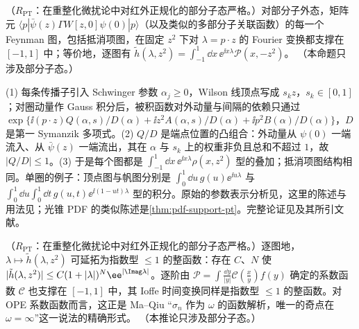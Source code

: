 
\begin{proposition}\label{prop:lamet-support}
（$R_{\mathrm{PT}}$：在重整化微扰论中对红外正规化的部分子态严格。）对部分子外态，矩阵元 $\langle p|\bar\psi(z)\Gamma W[z,0]\psi(0)|p\rangle$（以及类似的多部分子关联函数）的每一个 Feynman 图，包括抵消项图，在固定 $z^2$ 下对 $\lambda=p\cdot z$ 的 Fourier 变换都支撑在 $[-1,1]$ 中；等价地，逐图有 $\tilde h(\lambda,z^2)=\int_{-1}^1\dd x\,\ee^{\ii x\lambda}\mathcal P(x,-z^2)$。%
（本命题只涉及部分子态。）
\end{proposition}

\begin{proofsketch}
(1) 每条传播子引入 Schwinger 参数 $\alpha_j\ge0$，Wilson 线顶点写成 $s_kz$，$s_k\in[0,1]$；对圈动量作 Gauss 积分后，被积函数对外动量与间隔的依赖只通过 $\exp\{\ii(p\cdot z)Q(\alpha,s)/D(\alpha)+\ii z^2A(\alpha,s)/D(\alpha)+\ii p^2B(\alpha)/D(\alpha)\}$，$D$ 是第一 Symanzik 多项式。(2) $Q/D$ 是端点位置的凸组合：外动量从 $\psi(0)$ 一端流入、从 $\bar\psi(z)$ 一端流出，其在 $\alpha$ 与 $s_k$ 上的权重非负且总和不超过 $1$，故 $|Q/D|\le1$。(3) 于是每个图都是 $\int_{-1}^1\dd x\,\ee^{\ii x\lambda}\rho(x,z^2)$ 型的叠加；抵消项图结构相同。单圈的例子：顶点图与帆图分别是 $\int_0^1\dd u\,g(u)\ee^{\ii u\lambda}$ 与 $\int_0^1\dd u\int_0^1\dd t\,g(u,t)\ee^{\ii(1-ut)\lambda}$ 型的积分\cite[第~III~节]{IzubuchiEtAl2018}。原始的参数表示分析见\cite{Radyushkin:1983wh}，这里的陈述与用法见\cite{Radyushkin2017,Radyushkin:2018cvn,IzubuchiEtAl2018}；光锥 PDF 的类似陈述是\cref{thm:pdf-support-pt}。完整论证见\cite{Radyushkin2017}及其所引文献。
\end{proofsketch}

\begin{corollary}\label{cor:lamet-entire}
（$R_{\mathrm{PT}}$：在重整化微扰论中对红外正规化的部分子态严格。）逐图地，$\lambda\mapsto\tilde h(\lambda,z^2)$ 可延拓为指数型 $\le1$ 的整函数：存在 $C$、$N$ 使 $|\tilde h(\lambda,z^2)|\le C(1+|\lambda|)^N\ee^{|\Imag\lambda|}$。逐阶由 $\mathcal P=\int\frac{\dd y}{|y|}\mathcal C(\frac xy)f(y)$ 确定的系数函数 $\mathcal C$ 也支撑在 $[-1,1]$ 中，其 Ioffe 时间变换同样是指数型 $\le1$ 的整函数。对 OPE 系数函数而言，这正是 Ma--Qiu “$\sigma_n$ 作为 $\omega$ 的函数解析，唯一的奇点在 $\omega=\infty$”\cite{MaQiu2018}这一说法的精确形式。
（本推论只涉及部分子态。）
\end{corollary}

